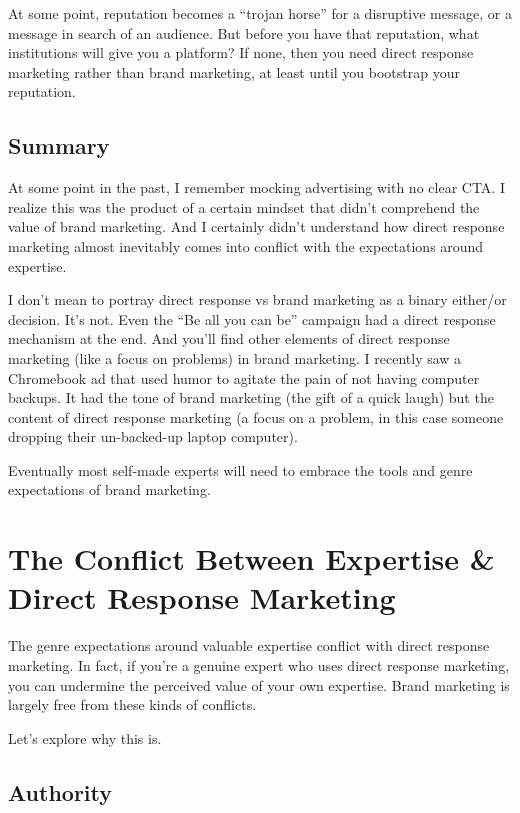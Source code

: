 \documentclass[13pt,]{tufte-handout}
\begin{document}
At some point, reputation becomes a ``trojan horse'' for a disruptive
message, or a message in search of an audience. But before you have that
reputation, what institutions will give you a platform? If none, then
you need direct response marketing rather than brand marketing, at least
until you bootstrap your reputation.

\hypertarget{summary-1}{%
\subsection{Summary}\label{summary-1}}

At some point in the past, I remember mocking advertising with no clear
CTA. I realize this was the product of a certain mindset that didn't
comprehend the value of brand marketing. And I certainly didn't
understand how direct response marketing almost inevitably comes into
conflict with the expectations around expertise.

I don't mean to portray direct response vs brand marketing as a binary
either/or decision. It's not. Even the ``Be all you can be'' campaign
had a direct response mechanism at the end. And you'll find other
elements of direct response marketing (like a focus on problems) in
brand marketing. I recently saw a Chromebook ad that used humor to
agitate the pain of not having computer backups. It had the tone of
brand marketing (the gift of a quick laugh) but the content of direct
response marketing (a focus on a problem, in this case someone dropping
their un-backed-up laptop computer).

Eventually most self-made experts will need to embrace the tools and
genre expectations of brand marketing.

\hypertarget{the-conflict-between-expertise-direct-response-marketing}{%
\section{The Conflict Between Expertise \& Direct Response
Marketing}\label{the-conflict-between-expertise-direct-response-marketing}}

The genre expectations around valuable expertise conflict with direct
response marketing. In fact, if you're a genuine expert who uses direct
response marketing, you can undermine the perceived value of your own
expertise. Brand marketing is largely free from these kinds of
conflicts.

Let's explore why this is.

\hypertarget{authority}{%
\subsection{Authority}\label{authority}}
\end{document}
